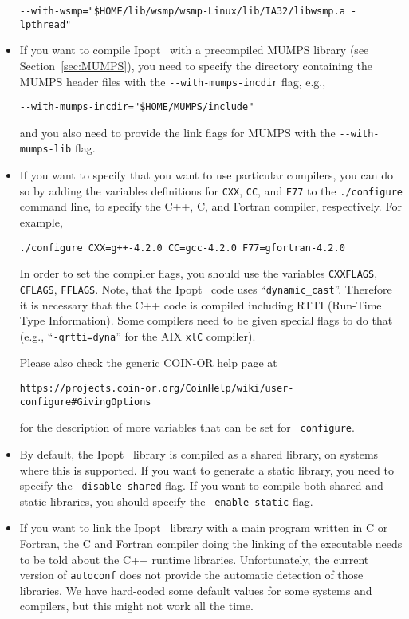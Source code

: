 \documentclass[10pt]{article}
\newcommand{\Ipopt}{{\sc Ipopt }}
\begin{document}
\begin{itemize}
  \verb|--with-wsmp="$HOME/lib/wsmp/wsmp-Linux/lib/IA32/libwsmp.a -lpthread"|

\item If you want to compile \Ipopt\ with a precompiled MUMPS library
  (see Section~\ref{sec:MUMPS}), you need to specify the directory containing
  the MUMPS header files with the \verb|--with-mumps-incdir| flag,
  e.g.,

  \verb|--with-mumps-incdir="$HOME/MUMPS/include"|

  and you also need to provide the link flags for MUMPS with the
  \verb|--with-mumps-lib| flag.

\item If you want to specify that you want to use particular
  compilers, you can do so by adding the variables definitions for
  {\tt CXX}, {\tt CC}, and {\tt F77} to the {\tt ./configure} command
  line, to specify the C++, C, and Fortran compiler, respectively.
  For example,

  {\tt ./configure CXX=g++-4.2.0 CC=gcc-4.2.0 F77=gfortran-4.2.0}

  In order to set the compiler flags, you should use the variables
  {\tt CXXFLAGS}, {\tt CFLAGS}, {\tt FFLAGS}.  Note, that the \Ipopt\
  code uses ``{\tt dynamic\_cast}''.  Therefore it is necessary that
  the C++ code is compiled including RTTI (Run-Time Type Information).
  Some compilers need to be given special flags to do that (e.g.,
  ``{\tt -qrtti=dyna}'' for the AIX {\tt xlC} compiler).

  Please also check the generic COIN-OR help page at

  \centerline{\tt https://projects.coin-or.org/CoinHelp/wiki/user-configure\#GivingOptions}

  for the description of more variables that can be set for {\tt
    configure}.

\item By default, the \Ipopt\ library is compiled as a shared library,
  on systems where this is supported.  If you want to generate a
  static library, you need to specify the {\tt --disable-shared}
  flag.  If you want to compile both shared and static libraries, you
  should specify the {\tt --enable-static} flag.

\item If you want to link the \Ipopt\ library with a main program
  written in C or Fortran, the C and Fortran compiler doing the
  linking of the executable needs to be told about the C++ runtime
  libraries.  Unfortunately, the current version of {\tt autoconf}
  does not provide the automatic detection of those libraries.  We
  have hard-coded some default values for some systems and compilers,
  but this might not work all the time.


\end{itemize}
\end{document}
